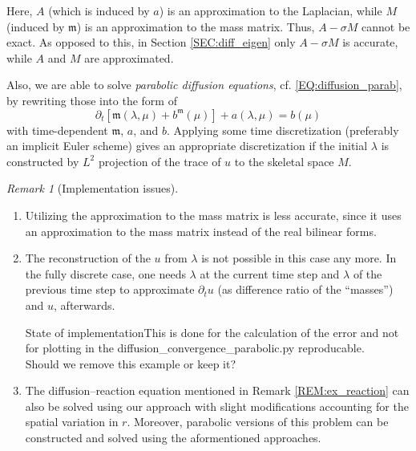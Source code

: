 \documentclass[a4paper, english, 12pt, reqno, draft]{amsart}
\theoremstyle{definition}
\theoremstyle{remark}
\newtheorem{remark}[theorem]{Remark}
\numberwithin{equation}{section}
\newcommand{\skeletalSpace}{\ensuremath{M}}
\newcommand{\mass}{\ensuremath{\mathfrak m}}
\begin{document}
Here, $A$ (which is induced by $a$) is an approximation to the Laplacian, while $M$ (induced by $\mass$) is an approximation to the mass matrix. Thus, $A - \sigma M$ cannot be exact. As opposed to this, in Section \ref{SEC:diff_eigen} only $A - \sigma M$ is accurate, while $A$ and $M$ are approximated.

Also, we are able to solve \emph{parabolic diffusion equations}, cf. \eqref{EQ:diffusion_parab}, by rewriting those into the form of
% 
\begin{equation}
 \partial_t \left[ \mass(\lambda, \mu) + b^\mass(\mu) \right] + a(\lambda, \mu) = b(\mu)
\end{equation}
% 
with time-dependent $\mass$, $a$, and $b$. Applying some time discretization (preferably an implicit Euler scheme) gives an appropriate discretization if the initial $\lambda$ is constructed by $L^2$ projection of the trace of $u$ to the skeletal space $\skeletalSpace$.
% 
\begin{remark}[Implementation issues]\
 \begin{enumerate}
  \item Utilizing the approximation to the mass matrix is less accurate, since it uses an approximation to the mass matrix instead of the real bilinear forms.
  \item The reconstruction of the $u$ from $\lambda$ is not possible in this case any more. In the fully discrete case, one needs $\lambda$ at the current time step and $\lambda$ of the previous time step to approximate $\partial_t u$ (as difference ratio of the ``masses'') and $u$, afterwards.
  \begin{envarwarning}{State of implementation}This is done for the calculation of the error and not for plotting in the diffusion\_convergence\_parabolic.py reproducable.\\ Should we remove this example or keep it?\end{envarwarning}
  \item The diffusion--reaction equation mentioned in Remark \ref{REM:ex_reaction} can also be solved using our approach with slight modifications accounting for the spatial variation in $r$. Moreover, parabolic versions of this problem can be constructed and solved using the aformentioned approaches.
 \end{enumerate}
\end{remark}
% 
\end{document}
